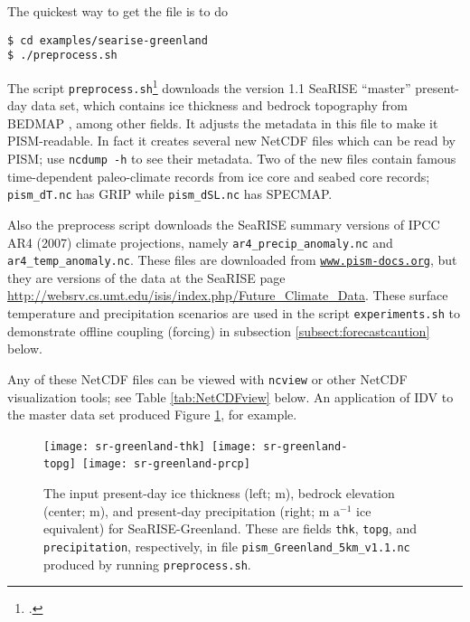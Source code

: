 \noindent The quickest way to get the file is to do
\begin{verbatim}
$ cd examples/searise-greenland
$ ./preprocess.sh
\end{verbatim}
\noindent The script \texttt{preprocess.sh}\footnote{.} downloads the version 1.1 SeaRISE ``master'' present-day data set, which contains ice thickness and bedrock topography from BEDMAP \cite{BamberLayberryGogenini}, among other fields.  It adjusts the metadata in this file to make it PISM-readable.  In fact it creates several new NetCDF files which can be read by PISM; use \texttt{ncdump -h} to see their metadata.  Two of the new files contain famous time-dependent paleo-climate records from ice core and seabed core records; \texttt{pism_dT.nc} has GRIP while \texttt{pism_dSL.nc} has SPECMAP.

Also the preprocess script downloads the SeaRISE summary versions of IPCC AR4 (2007) climate projections, namely \texttt{ar4_precip_anomaly.nc} and \texttt{ar4_temp_anomaly.nc}.  These files are downloaded from \href{http://www.pism-docs.org/}{\texttt{www.pism-docs.org}}, but they are versions of the data at the SeaRISE page \url{http://websrv.cs.umt.edu/isis/index.php/Future_Climate_Data}.  These surface temperature and precipitation scenarios are used in the script \texttt{experiments.sh} to demonstrate offline coupling (forcing) in subsection \ref{subsect:forecastcaution} below.

Any of these NetCDF files can be viewed with \texttt{ncview} or other NetCDF visualization tools; see Table \ref{tab:NetCDFview} below.  An application of IDV to the master data set produced Figure \ref{fig:sr-input}, for example.

\begin{figure}[ht]
\centering
\mbox{\texttt{[image: sr-greenland-thk]}
  \qquad
  \texttt{[image: sr-greenland-topg]}
  \qquad
  \texttt{[image: sr-greenland-prcp]}}
\caption{The input present-day ice thickness (left; m), bedrock elevation (center; m), and present-day precipitation (right; m $\text{a}^{-1}$ ice equivalent) for SeaRISE-Greenland.  These are fields \texttt{thk}, \texttt{topg}, and \texttt{precipitation}, respectively, in file \texttt{pism_Greenland_5km_v1.1.nc} produced by running \texttt{preprocess.sh}.}
\label{fig:sr-input}
\end{figure}


